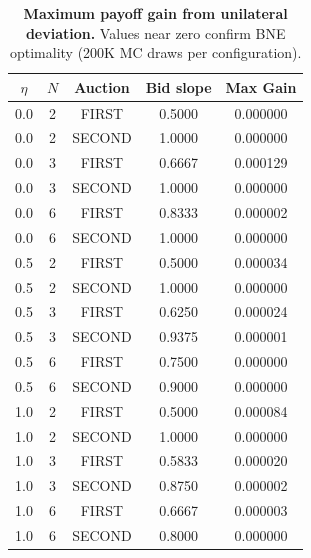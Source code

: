 \begin{table}[H]
  \centering
  \small
  \caption[Maximum payoff gain from unilateral deviation]{\textbf{Maximum payoff gain from unilateral deviation.} Values near zero confirm BNE optimality (200K MC draws per configuration).}
  \label{tab:bne_deviation}
  \begin{tabular}{ccccc}
    \toprule
    $\eta$ & $N$ & Auction & Bid slope & Max Gain \\
    \midrule
    0.0 & 2 & FIRST & 0.5000 & 0.000000 \\
    0.0 & 2 & SECOND & 1.0000 & 0.000000 \\
    0.0 & 3 & FIRST & 0.6667 & 0.000129 \\
    0.0 & 3 & SECOND & 1.0000 & 0.000000 \\
    0.0 & 6 & FIRST & 0.8333 & 0.000002 \\
    0.0 & 6 & SECOND & 1.0000 & 0.000000 \\
    0.5 & 2 & FIRST & 0.5000 & 0.000034 \\
    0.5 & 2 & SECOND & 1.0000 & 0.000000 \\
    0.5 & 3 & FIRST & 0.6250 & 0.000024 \\
    0.5 & 3 & SECOND & 0.9375 & 0.000001 \\
    0.5 & 6 & FIRST & 0.7500 & 0.000000 \\
    0.5 & 6 & SECOND & 0.9000 & 0.000000 \\
    1.0 & 2 & FIRST & 0.5000 & 0.000084 \\
    1.0 & 2 & SECOND & 1.0000 & 0.000000 \\
    1.0 & 3 & FIRST & 0.5833 & 0.000020 \\
    1.0 & 3 & SECOND & 0.8750 & 0.000002 \\
    1.0 & 6 & FIRST & 0.6667 & 0.000003 \\
    1.0 & 6 & SECOND & 0.8000 & 0.000000 \\
    \bottomrule
  \end{tabular}
\end{table}